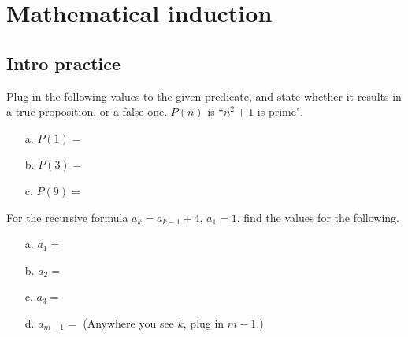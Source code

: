 \documentclass[../Template-Assignment.tex]{subfiles}
\begin{document}
    \newpage
    \section{Mathematical induction}

    \subsection{Intro practice}

        \begin{questionNOGRADE}{\thequestion}

            Plug in the following values to the given predicate, and state
            whether it results in a true proposition, or a false one.
            $P(n)$ is ``$n^{2} + 1$ is prime".

            \begin{itemize}
                \item[a.] $P(1) = $ 
                \item[b.] $P(3) = $ 
                \item[c.] $P(9) = $ 
            \end{itemize}
            
        \end{questionNOGRADE}

        \hrulefill

        \begin{questionNOGRADE}{\thequestion}

            For the recursive formula $a_{k} = a_{k-1} + 4$, $a_{1} = 1$,
            find the values for the following.

            \begin{itemize}
                \item[a.] $a_{1} = $    
                \item[b.] $a_{2} = $    
                \item[c.] $a_{3} = $    
                \item[d.] $a_{m-1} = $  (Anywhere you see $k$, plug in $m-1$.)
            \end{itemize}
            
        \end{questionNOGRADE}
\end{document}
